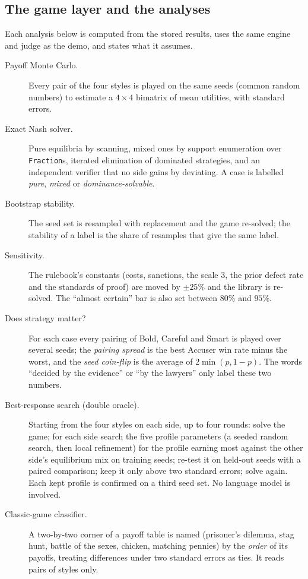 \subsection{The game layer and the analyses}\label{sec:analyses}
Each analysis below is computed from the stored results, uses the same engine and judge as the demo, and states what it assumes.
\begin{description}
\item[Payoff Monte Carlo.] Every pair of the four styles is played on the same seeds (common random numbers) to estimate a $4\times4$ bimatrix of mean utilities, with standard errors.
\item[Exact Nash solver.] Pure equilibria by scanning, mixed ones by support enumeration over \texttt{Fraction}s, iterated elimination of dominated strategies, and an independent verifier that no side gains by deviating. A case is labelled \emph{pure}, \emph{mixed} or \emph{dominance-solvable}.
\item[Bootstrap stability.] The seed set is resampled with replacement and the game re-solved; the stability of a label is the share of resamples that give the same label.
\item[Sensitivity.] The rulebook's constants (costs, sanctions, the scale $3$, the prior defect rate and the standards of proof) are moved by $\pm25\%$ and the library is re-solved. The ``almost certain'' bar is also set between $80\%$ and $95\%$.
\item[Does strategy matter?] For each case every pairing of Bold, Careful and Smart is played over several seeds; the \emph{pairing spread} is the best Accuser win rate minus the worst, and the \emph{seed coin-flip} is the average of $2\min(p,1-p)$. The words ``decided by the evidence'' or ``by the lawyers'' only label these two numbers.
\item[Best-response search (double oracle).] Starting from the four styles on each side, up to four rounds: solve the game; for each side search the five profile parameters (a seeded random search, then local refinement) for the profile earning most against the other side's equilibrium mix on training seeds; re-test it on held-out seeds with a paired comparison; keep it only above two standard errors; solve again. Each kept profile is confirmed on a third seed set. No language model is involved.
\item[Classic-game classifier.] A two-by-two corner of a payoff table is named (prisoner's dilemma, stag hunt, battle of the sexes, chicken, matching pennies) by the \emph{order} of its payoffs, treating differences under two standard errors as ties. It reads pairs of styles only.

\end{description}
